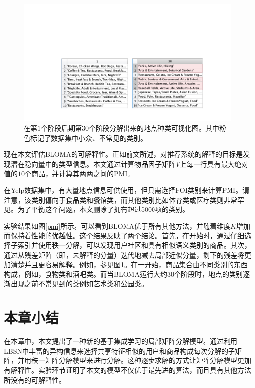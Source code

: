 \begin{figure}[!t]
\centering
\includegraphics[width=\textwidth]{pics/factors.pdf}
\caption{在第$1$个阶段后期第$30$个阶段分解出来的地点种类可视化图。其中粉色标记了数据集中小众、不常见的类别。} 
\label{factors}
\end{figure}

现在本文评估BLOMA的可解释性。正如前文所述，对推荐系统的解释的目标是发现潜在隐向量中的类型信息。本文通过计算物品因子矩阵$V$上每一行具有最大绝对值的$10$个商品，并计算其两两之间的PMI。

在Yelp数据集中，有大量地点信息可供使用，但只需选择POI类别来计算PMI。请注意，该类别偏向于食品类和餐馆类，而其他类别比如体育类或医疗类则非常罕见。为了平衡这个问题，本文删除了拥有超过5000项的类别。

实验结果如图\ref{pmi}所示。可以看到BLOMA优于所有其他方法，并随着维度$ K $增加而保持着性能的优越性。这个结果反映了两个结论。首先，在开始时，通过仔细选择子索引并使用秩一分解，可以发现用户社区和具有相似语义类别的商品。其次，通过从残差矩阵（即，未解释的分量）迭代地减去局部近似分量，剩下的残差将更加清楚并且更容易解释。例如，参见图\ref{factors}。在一开始，商品集合由不同类别的东西构成，例如，食物类和酒吧类。而当BLOMA运行大约30个阶段时，地点的类别逐渐出现之前不常见到的类例如艺术类和公园类。





\section{本章小结}
\label{conclusion}
在本章中，本文提出了一种新的基于集成学习的局部矩阵分解模型。通过利用LBSN中丰富的异构信息来选择共享特征相似的用户和商品构成每次分解的子矩阵，并用秩一矩阵分解模型来进行分解。这种逐步求解的方式让矩阵分解模型更加有解释性。实验环节证明了本文的模型不仅优于最先进的算法，而且具有其他方法所没有的可解释性。
\newpage\mbox{}\thispagestyle{empty}\newpage


